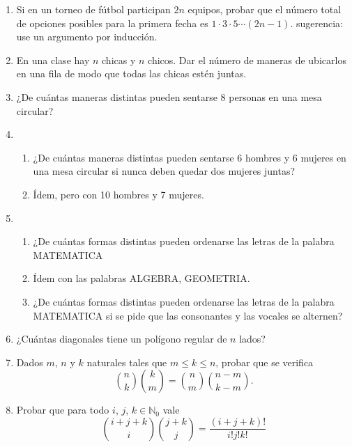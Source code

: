 \documentclass[a4paper,12pt,twoside,spanish,reqno]{amsbook}
\numberwithin{equation}{section}
\begin{document}
\begin {enumerate}
\begin{enumerate}
    \item El profesor $X$ y el estudiante $Y$ no pueden estar juntos en el comité?
\end{enumerate}


\item Si en un torneo de fútbol participan $2n$ equipos, probar que el número total de opciones posibles para la primera fecha es $1\cdot 3\cdot 5 \cdots (2n - 1)$. sugerencia: use un argumento por inducción. 


\item En una clase hay $n$ chicas y $n$ chicos. Dar el número de maneras de ubicarlos en una fila de modo que todas las chicas estén juntas.


\item ¿De cuántas maneras  distintas pueden sentarse 8 personas en una mesa circular?


\item \begin{enumerate}
    \item ¿De cuántas maneras distintas pueden sentarse 6 hombres y 6 mujeres en una mesa circular si nunca deben quedar dos mujeres juntas?
    \item \'Idem, pero con 10 hombres y 7 mujeres.
\end{enumerate}


\item 
\begin{enumerate}
    \item  ¿De cuántas formas distintas pueden ordenarse las letras de la palabra MATEMATICA
    \item \'Idem con las palabras ALGEBRA, GEOMETRIA.
    \item ¿De cuántas formas distintas pueden ordenarse las letras de la palabra MATEMATICA si se pide que las consonantes y las vocales se alternen?
\end{enumerate}


\item ¿Cuántas diagonales tiene un polígono regular de $n$ lados?


\item Dados $m$, $n$ y $k$ naturales tales que $m \le k \le n$, probar que se verifica
\begin{equation*}
    \binom{n}{k}\binom{k}{m} = \binom{n}{m}\binom{n-m}{k-m}.
\end{equation*}



\item Probar que para todo $i$, $j$, $k \in {\mathbb N}_0$ vale
\begin{equation*}
    \binom{i + j + k}{i}\binom{j+k}{j} = \frac{(i+j+k)!}{i!j!k!}
\end{equation*}



\end{enumerate}
\end{document}
